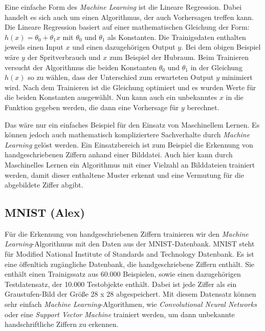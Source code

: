 Eine einfache Form des \textit{Machine Learning} ist die Lineare Regression. Dabei handelt es sich auch um einen Algorithmus, der auch Vorhersagen treffen kann.
Die Lineare Regression basiert auf einer mathematischen Gleichung der Form: $h(x) = \theta_0 + \theta_1x $ mit $\theta_0$ und $\theta_1$ als Konstanten.
Die Trainigsdaten enthalten jeweils einen Input $x$ und einen dazugehörigen Output $y$. Bei dem obigen Beispiel wäre $y$ der Spritverbrauch und $x$ zum Beispiel der
Hubraum. Beim Trainieren versucht der Algorithmus die beiden Konstanten $\theta_0$ und $\theta_1$ in der Gleichung $h(x)$ so zu wählen, 
dass der Unterschied zum erwarteten Output $y$ minimiert wird. Nach dem Trainieren ist die Gleichung optimiert und es wurden Werte für die beiden Konstanten ausgewählt.
Nun kann auch ein unbekanntes $x$ in die Funktion gegeben werden, die dann eine Vorhersage für $y$ berechnet.\cite{simon_2015}

Das wäre nur ein einfaches Beispiel für den Einsatz von Maschinellem Lernen. Es können jedoch auch mathematisch kompliziertere Sachverhalte durch \textit{Machine Learning}
gelöst werden. Ein Einsatzbereich ist zum Beispiel die Erkennung von handgeschriebenen Ziffern anhand einer Bilddatei. Auch hier kann durch Maschinelles Lernen ein
Algorithmus mit einer Vielzahl an Bilddateien trainiert werden, damit dieser enthaltene Muster erkennt und eine Vermutung für die abgebildete Ziffer abgibt. 

\subsection{MNIST (Alex)}
Für die Erkennung von handgeschriebenen Ziffern trainieren wir den \textit{Machine Learning}-Algorithmus mit den Daten aus der MNIST-Datenbank.
MNIST steht für Modified National Institute of Standards and Technology Datenbank. 
Es ist eine öffenltich zugängliche Datenbank, die handgeschriebene Ziffern enthält.
Sie enthält einen Trainigssatz aus 60.000 Beispielen, sowie einen dazugehörigen Testdatensatz, der 10.000 Testobjekte enthält.
Dabei ist jede Ziffer als ein Graustufen-Bild der Größe 28 x 28 abgespeichert.
Mit diesem Datensatz können sehr einfach \textit{Machine Learning}-Algorithmen, wie \textit{Convolutional Neural Networks} oder eine \textit{Support Vector Machine} trainiert
werden, um dann unbekannte handschriftliche Ziffern zu erkennen.
